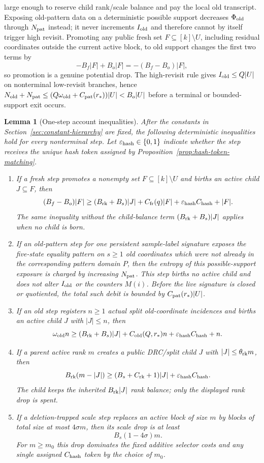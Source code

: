 \documentclass[11pt]{article}
\newtheorem{lemma}[theorem]{Lemma}
\begin{document}
large enough to reserve child rank/scale balance and pay the local old
transcript.
Exposing old-pattern data on a deterministic possible support decreases
$\Phi_{\rm old}$ through $N_{\rm pat}$ instead; it never increments
$I_{\rm old}$ and therefore cannot by itself trigger high revisit.
Promoting any
public fresh set $F\subseteq [k]\setminus U$, including residual coordinates
outside the current active block, to old support changes the first two terms by
\[
  -B_f|F|+B_o|F|=-(B_f-B_o)|F|,
\]
so promotion is a genuine potential drop.  The high-revisit rule gives
$I_{\rm old}\le Q|U|$ on nonterminal low-revisit branches, hence
$N_{\rm old}+N_{\rm pat}
\le (Q\omega_{\rm old}+C_{\rm pat}(r_*))|U|<B_o|U|$
before a terminal or bounded-support exit occurs.

\begin{lemma}[One-step account inequalities]
\label{lem:step-account-inequalities}
After the constants in Section~\ref{sec:constant-hierarchy} are fixed, the
following deterministic inequalities hold for every nonterminal step.  Let
$\varepsilon_{\rm hash}\in\{0,1\}$ indicate whether the step receives the
unique hash token assigned by Proposition~\ref{prop:hash-token-matching}.
\begin{enumerate}[label=\textup{(\roman*)}]
\item If a fresh step promotes a nonempty set $F\subseteq [k]\setminus U$ and
births an active child $J\subseteq F$, then
\[
  (B_f-B_o)|F|
  \ge
  (B_{\rm rk}+B_s)|J|+C_{\rm fr}(q)|F|
  +\varepsilon_{\rm hash}C_{\rm hash}+|F|.
\]
The same inequality without the child-balance term
$(B_{\rm rk}+B_s)|J|$ applies when no child is born.
\item If an old-pattern step for one persistent sample-label signature exposes the
five-state equality pattern on $s\ge1$ old coordinates which were not already
in the corresponding pattern domain $P$, then the entropy of this
possible-support exposure is charged by increasing $N_{\rm pat}$.  This step
births no active child and does not alter $I_{\rm old}$ or the counters
$M(i)$.  Before the live signature is closed or quotiented, the total such
debit is bounded by $C_{\rm pat}(r_*)|U|$.
\item If an old step registers $n\ge1$ actual split old-coordinate incidences
and births an active child $J$ with $|J|\le n$, then
\[
  \omega_{\rm old}n
  \ge
  (B_{\rm rk}+B_s)|J|+C_{\rm old}(Q,r_*)n
  +\varepsilon_{\rm hash}C_{\rm hash}+n.
\]
\item If a parent active rank $m$ creates a public DRC/split child $J$ with
$|J|\le\theta_{\rm rk}m$, then
\[
  B_{\rm rk}(m-|J|)
  \ge
  (B_s+C_{\rm rk}+1)|J|+\varepsilon_{\rm hash}C_{\rm hash}.
\]
The child keeps the inherited $B_{\rm rk}|J|$ rank balance; only the displayed
rank drop is spent.
\item If a deletion-trapped scale step replaces an active block of size $m$ by
blocks of total size at most $4\sigma m$, then its scale drop is at least
\[
  B_s(1-4\sigma)m.
\]
For $m\ge m_0$ this drop dominates the fixed additive selector costs and any
single assigned $C_{\rm hash}$ token by the choice of $m_0$.
\end{enumerate}
\end{lemma}
\end{document}
